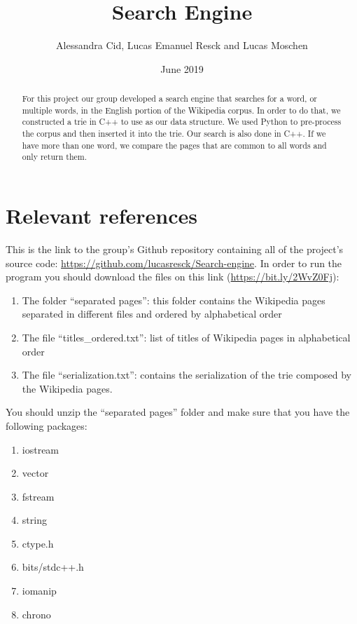 \documentclass{article}
\title{Search Engine}
\author{Alessandra Cid, Lucas Emanuel Resck  
and Lucas Moschen}
\date{June 2019}
\begin{document}
\maketitle

\begin{abstract}
For this project our group developed a search engine that searches for a word, or multiple words, in the English portion of the Wikipedia corpus. In order to do that, we constructed a trie in C++ to use as our data structure. We used Python to pre-process the corpus and then inserted it into the trie. Our search is also done in C++. If we have more than one word, we compare the pages that are common to all words and only return them. 
\end{abstract}

\section*{Relevant references}
This is the link to the group's Github repository containing all of the project's source code: \url{https://github.com/lucasresck/Search-engine}. In order to run the program you should download the files on this link (\url{https://bit.ly/2WvZ0Fj}): 

\begin{enumerate}
\item The folder ``separated pages'': this folder contains the Wikipedia pages separated in different files and ordered by alphabetical order

\item The file ``titles\_ordered.txt'': list of titles of Wikipedia pages in alphabetical order

\item The file ``serialization.txt'': contains the serialization of the trie composed by the Wikipedia pages. 

 \end{enumerate}

You should unzip the ``separated pages'' folder and make sure that you have the following packages:
\begin{enumerate}
\item iostream
\item vector
\item fstream
\item string
\item ctype.h
\item bits/stdc++.h
\item iomanip
\item chrono
 \end{enumerate}
\end{document}
